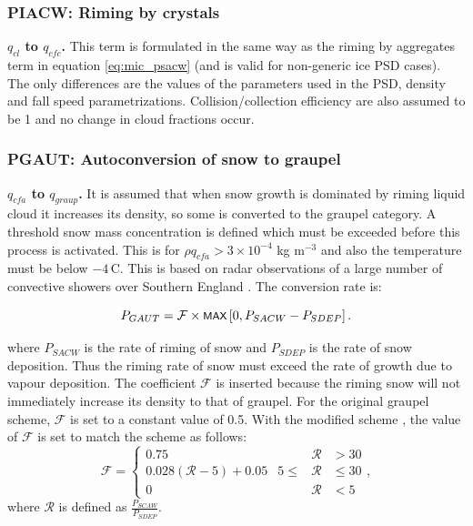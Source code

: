 \documentclass{UMDP_article}
\newcommand{\mmax}[1] {\mbox{\footnotesize \sf MAX} \left[#1\right]  }
\def\bq{\begin{equation}}
\def\eq{\end{equation}}
\begin{document}
\subsubsection{PIACW:  Riming by crystals}

\textbf{$q_{cl}$ to $q_{cfc}$.}
This term is formulated in the same way as 
the riming by aggregates term in equation \ref{eq:mic_psacw}  
(and is valid for non-generic ice PSD cases). The only differences
are the values of the parameters used in the PSD, density and fall speed
parametrizations. Collision/collection efficiency are also assumed to be 1 and
no change in cloud fractions occur.


\subsubsection{PGAUT:  Autoconversion of snow to graupel}
\label{sec:PGAUT}

\textbf{$q_{cfa}$ to $q_{graup}$.}
It is assumed that when snow growth is dominated by riming
liquid cloud it increases its density, so some is converted to the graupel
category. A threshold snow mass concentration is defined which must be
exceeded before this process is activated. This is for 
$\rho q_{cfa} >3 \times 10^{-4}$ kg m$^{-3}$ and also the temperature must be
below 
$-4$\,C. This is based on radar observations of a large number of
convective showers over Southern England \citep{Forbes:Halliwell:2003}. 
The conversion rate is:

\bq
P_{GAUT}= \mathcal{F} \times \mmax{0, P_{SACW}-P_{SDEP}}.
\label{eq:mic_pgaut}
\eq

where $P_{SACW}$ is the rate of riming of snow and $P_{SDEP}$ is the rate of snow 
deposition. Thus the riming rate of snow must exceed the rate of growth due to vapour
deposition. The coefficient $\mathcal{F}$ is inserted because the riming 
snow will not immediately increase its density to that of graupel. For the original
\cite{Forbes:Halliwell:2003} graupel scheme, $\mathcal{F}$ is set to a constant value
of 0.5. With the modified scheme \cite{Field:etal:2019}, the value of $\mathcal{F}$
is set to match the \cite{Thompson:etal:2008} scheme as follows:
\bq
  \mathcal{F}=\left\{ \begin{array}{llll}
      0.75  & & \mathcal{R} & > 30 \\
      0.028 (\mathcal{R} -5) + 0.05 & 5 \le & \mathcal{R} & \le 30 \\
      0     & & \mathcal{R} & < 5
    \end{array},\right.
\label{eq:mic_pgaut_f}
\eq
where $\mathcal{R}$ is defined as $\frac{P_{SCAW}}{P_{SDEP}}$.
\end{document}
